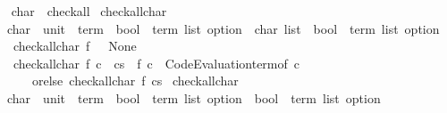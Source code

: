 \begin{isabellebody}
\isanewline
{}\isamarkupfalse%
%
\isadelimproof
\ %
\endisadelimproof
%
\isatagproof
\isacommand{{\isachardot}{\kern0pt}{\isachardot}{\kern0pt}}\isamarkupfalse%
%
\endisatagproof
{\isafoldproof}%
%
\isadelimproof
%
\endisadelimproof
\isanewline
\isanewline
{}\isamarkupfalse%
\isanewline
\isanewline
{}\isamarkupfalse%
\ char\ {\isacharcolon}{\kern0pt}{\isacharcolon}{\kern0pt}\ check{\isacharunderscore}{\kern0pt}all\isanewline
{}\isanewline
\isanewline
{}\isamarkupfalse%
\ check{\isacharunderscore}{\kern0pt}all{\isacharunderscore}{\kern0pt}char{\isacharprime}{\kern0pt}\ {\isacharcolon}{\kern0pt}{\isacharcolon}{\kern0pt}\isanewline
\ \ {\isachardoublequoteopen}{\isacharparenleft}{\kern0pt}char\ {\isasymtimes}\ {\isacharparenleft}{\kern0pt}unit\ {\isasymRightarrow}\ term{\isacharparenright}{\kern0pt}\ {\isasymRightarrow}\ {\isacharparenleft}{\kern0pt}bool\ {\isasymtimes}\ term\ list{\isacharparenright}{\kern0pt}\ option{\isacharparenright}{\kern0pt}\ {\isasymRightarrow}\ char\ list\ {\isasymRightarrow}\ {\isacharparenleft}{\kern0pt}bool\ {\isasymtimes}\ term\ list{\isacharparenright}{\kern0pt}\ option{\isachardoublequoteclose}\isanewline
\ \ \ {\isachardoublequoteopen}check{\isacharunderscore}{\kern0pt}all{\isacharunderscore}{\kern0pt}char{\isacharprime}{\kern0pt}\ f\ {\isacharbrackleft}{\kern0pt}{\isacharbrackright}{\kern0pt}\ {\isacharequal}{\kern0pt}\ None{\isachardoublequoteclose}\isanewline
\ \ {\isacharbar}{\kern0pt}\ {\isachardoublequoteopen}check{\isacharunderscore}{\kern0pt}all{\isacharunderscore}{\kern0pt}char{\isacharprime}{\kern0pt}\ f\ {\isacharparenleft}{\kern0pt}c\ {\isacharhash}{\kern0pt}\ cs{\isacharparenright}{\kern0pt}\ {\isacharequal}{\kern0pt}\ f\ {\isacharparenleft}{\kern0pt}c{\isacharcomma}{\kern0pt}\ {\isasymlambda}{\isacharunderscore}{\kern0pt}{\isachardot}{\kern0pt}\ Code{\isacharunderscore}{\kern0pt}Evaluation{\isachardot}{\kern0pt}term{\isacharunderscore}{\kern0pt}of\ c{\isacharparenright}{\kern0pt}\isanewline
\ \ \ \ \ \ orelse\ check{\isacharunderscore}{\kern0pt}all{\isacharunderscore}{\kern0pt}char{\isacharprime}{\kern0pt}\ f\ cs{\isachardoublequoteclose}\isanewline
\isanewline
{}\isamarkupfalse%
\ check{\isacharunderscore}{\kern0pt}all{\isacharunderscore}{\kern0pt}char\ {\isacharcolon}{\kern0pt}{\isacharcolon}{\kern0pt}\isanewline
\ \ {\isachardoublequoteopen}{\isacharparenleft}{\kern0pt}char\ {\isasymtimes}\ {\isacharparenleft}{\kern0pt}unit\ {\isasymRightarrow}\ term{\isacharparenright}{\kern0pt}\ {\isasymRightarrow}\ {\isacharparenleft}{\kern0pt}bool\ {\isasymtimes}\ term\ list{\isacharparenright}{\kern0pt}\ option{\isacharparenright}{\kern0pt}\ {\isasymRightarrow}\ {\isacharparenleft}{\kern0pt}bool\ {\isasymtimes}\ term\ list{\isacharparenright}{\kern0pt}\ option{\isachardoublequoteclose}\isanewline

\end{isabellebody}
